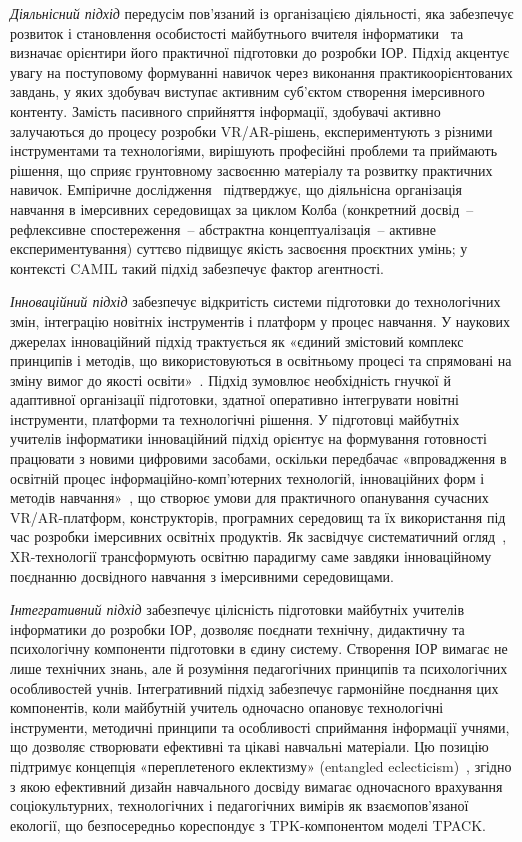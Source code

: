 \emph{Діяльнісний підхід} передусім пов'язаний із організацією діяльності, яка забезпечує розвиток і становлення особистості майбутнього вчителя інформатики~\cite{Dychkivska2012Innovative} та визначає орієнтири його практичної підготовки до розробки ІОР. Підхід акцентує увагу на поступовому формуванні навичок через виконання практикоорієнтованих завдань, у яких здобувач виступає активним суб'єктом створення імерсивного контенту. Замість пасивного сприйняття інформації, здобувачі активно залучаються до процесу розробки VR/AR-рішень, експериментують з різними інструментами та технологіями, вирішують професійні проблеми та приймають рішення, що сприяє грунтовному засвоєнню матеріалу та розвитку практичних навичок. Емпіричне дослідження~\cite{Kee2023Experiential} підтверджує, що діяльнісна організація навчання в імерсивних середовищах за циклом Колба (конкретний досвід~-- рефлексивне спостереження~-- абстрактна концептуалізація~-- активне експериментування) суттєво підвищує якість засвоєння проєктних умінь; у контексті CAMIL такий підхід забезпечує фактор агентності.

\emph{Інноваційний підхід} забезпечує відкритість системи підготовки до технологічних змін, інтеграцію новітніх інструментів і платформ у процес навчання. У наукових джерелах інноваційний підхід трактується як «єдиний змістовий комплекс принципів і методів, що використовуються в освітньому процесі та спрямовані на зміну вимог до якості освіти»~\cite[c.~33]{Sysoieva2015Pedagogy}. Підхід зумовлює необхідність гнучкої й адаптивної організації підготовки, здатної оперативно інтегрувати новітні інструменти, платформи та технологічні рішення. У підготовці майбутніх учителів інформатики інноваційний підхід орієнтує на формування готовності працювати з новими цифровими засобами, оскільки передбачає «впровадження в освітній процес інформаційно-комп'ютерних технологій, інноваційних форм і методів навчання»~\cite[c.~34]{Sysoieva2015Pedagogy}, що створює умови для практичного опанування сучасних VR/AR-платформ, конструкторів, програмних середовищ та їх використання під час розробки імерсивних освітніх продуктів. Як засвідчує систематичний огляд~\cite{Crogman2025ExperientialXR}, XR-технології трансформують освітню парадигму саме завдяки інноваційному поєднанню досвідного навчання з імерсивними середовищами.

\emph{Інтегративний підхід} забезпечує цілісність підготовки майбутніх учителів інформатики до розробки ІОР, дозволяє поєднати технічну, дидактичну та психологічну компоненти підготовки в єдину систему. Створення ІОР вимагає не лише технічних знань, але й розуміння педагогічних принципів та психологічних особливостей учнів. Інтегративний підхід забезпечує гармонійне поєднання цих компонентів, коли майбутній учитель одночасно опановує технологічні інструменти, методичні принципи та особливості сприймання інформації учнями, що дозволяє створювати ефективні та цікаві навчальні матеріали. Цю позицію підтримує концепція «переплетеного еклектизму» (entangled eclecticism)~\cite{Schmidt2024EntangledLXD}, згідно з якою ефективний дизайн навчального досвіду вимагає одночасного врахування соціокультурних, технологічних і педагогічних вимірів як взаємопов'язаної екології, що безпосередньо кореспондує з TPK-компонентом моделі TPACK.

